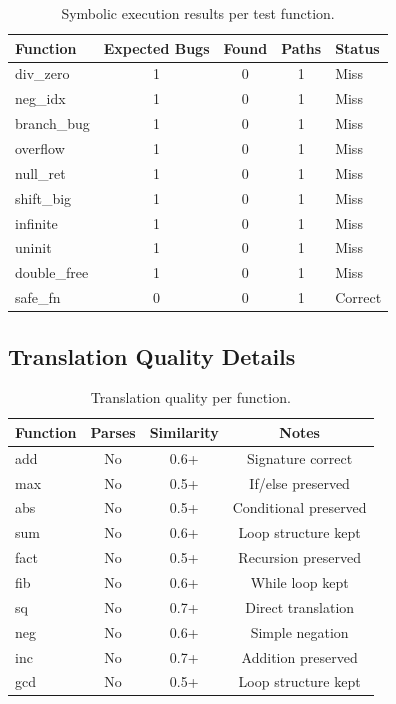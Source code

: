 \documentclass[11pt,a4paper]{article}
\begin{document}
\begin{appendices}
\begin{table}[h]
\centering
\caption{Symbolic execution results per test function.}
\label{tab:symexec-detail}
\begin{tabular}{lcccl}
\toprule
Function & Expected Bugs & Found & Paths & Status \\
\midrule
div\_zero    & 1 & 0 & 1 & Miss \\
neg\_idx     & 1 & 0 & 1 & Miss \\
branch\_bug  & 1 & 0 & 1 & Miss \\
overflow     & 1 & 0 & 1 & Miss \\
null\_ret    & 1 & 0 & 1 & Miss \\
shift\_big   & 1 & 0 & 1 & Miss \\
infinite     & 1 & 0 & 1 & Miss \\
uninit       & 1 & 0 & 1 & Miss \\
double\_free & 1 & 0 & 1 & Miss \\
safe\_fn     & 0 & 0 & 1 & Correct \\
\bottomrule
\end{tabular}
\end{table}

\subsection{Translation Quality Details}

\begin{table}[h]
\centering
\caption{Translation quality per function.}
\label{tab:trans-detail}
\begin{tabular}{lccc}
\toprule
Function & Parses & Similarity & Notes \\
\midrule
add  & No & 0.6+ & Signature correct \\
max  & No & 0.5+ & If/else preserved \\
abs  & No & 0.5+ & Conditional preserved \\
sum  & No & 0.6+ & Loop structure kept \\
fact & No & 0.5+ & Recursion preserved \\
fib  & No & 0.6+ & While loop kept \\
sq   & No & 0.7+ & Direct translation \\
neg  & No & 0.6+ & Simple negation \\
inc  & No & 0.7+ & Addition preserved \\
gcd  & No & 0.5+ & Loop structure kept \\
\bottomrule
\end{tabular}
\end{table}



\end{appendices}
\end{document}
